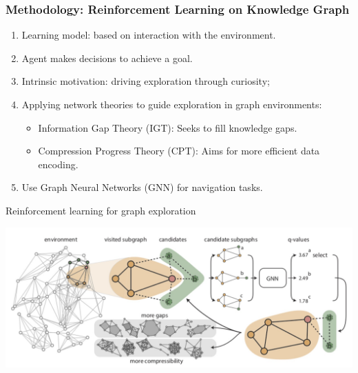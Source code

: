 \documentclass{beamer}
\begin{document}

\begin{frame}
\frametitle{Methodology: Reinforcement Learning on Knowledge Graph}
\begin{enumerate}
    \item Learning model: based on interaction with the environment.
    \item Agent makes decisions to achieve a goal.
    \item Intrinsic motivation: driving exploration through curiosity;
    \item Applying network theories to guide exploration in graph environments:
    \begin{itemize}
    \item Information Gap Theory (IGT): Seeks to fill knowledge gaps.
    \item Compression Progress Theory (CPT): Aims for more efficient data encoding.
\end{itemize}
	\item Use Graph Neural Networks (GNN) for navigation tasks.
\end{enumerate}
\end{frame}
\begin{frame}{Reinforcement learning for graph exploration}

\begin{center} \includegraphics[scale=.4]{RL.jpg}\end{center}

\end{frame}
\end{document}
